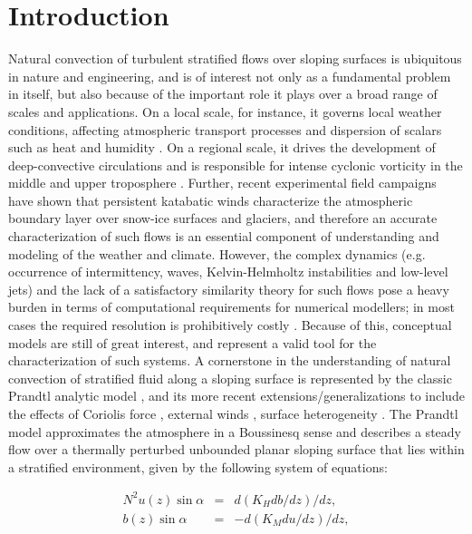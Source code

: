 \section{Introduction}
Natural convection of turbulent stratified flows over sloping surfaces is ubiquitous in nature and engineering, and is of interest not only as a fundamental problem in itself, but also because of the important role it plays over a broad range of scales and applications. 
On a local scale, for instance, it governs local weather conditions, affecting atmospheric transport processes and dispersion of scalars such as heat and humidity \citep{Monti2002, Nylen2004b}. 
On a regional scale, it drives the development of deep-convective circulations \citep{Egger1985, Parish1998} and is responsible for intense cyclonic vorticity in the middle and upper troposphere \citep{Parish1992}.
Further, recent experimental field campaigns \citep{Chu1987, Oerlemans1993} have shown that persistent katabatic winds characterize the atmospheric boundary layer over snow-ice surfaces and glaciers, and therefore an accurate characterization of such flows is an essential component of understanding and modeling of the weather and climate.
However, the complex dynamics (e.g. occurrence of intermittency, waves, Kelvin-Helmholtz instabilities and low-level jets) and the lack of a satisfactory similarity theory for such flows \citep{Nadeau2012} pose a heavy burden in terms of computational requirements for numerical modellers; in most cases the required resolution is prohibitively costly \citep{Fedorovich2009, Fedorovich2009d, Burkholder2011a}.
Because of this, conceptual models are still of great interest, and represent a valid tool for the characterization of such systems. 
A cornerstone in the understanding of natural convection of stratified fluid along a sloping surface is represented by the classic Prandtl analytic model \citep{Prandtl}, and its more recent extensions/generalizations to include the effects of Coriolis force \citep{Gutman1964}, external winds \citep{Lykosov_1972}, surface heterogeneity \citep{Shapiro2007, Oldroyd2014}.
The Prandtl model approximates the atmosphere in a Boussinesq sense and describes a steady flow over a thermally perturbed unbounded planar sloping surface that lies within a stratified environment, given by the following system of equations:
%
\begin{linenomath*}
\begin{eqnarray}
	N^2 u(z) \sin{\alpha} & = & d( K_H db/dz )/dz,
	\label{eqn1u} \\
	b(z) \sin{\alpha} & = & -d( K_M du/dz )/dz,
	\label{eqn1b}
\end{eqnarray}
\end{linenomath*}
